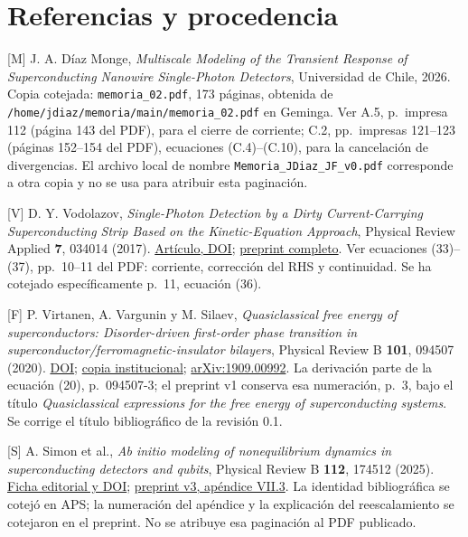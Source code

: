 \documentclass[
  spanish,
  10pt,
  a4paper,
]{article}
\newcounter{none} %
\begin{document}
\section{Referencias y procedencia}\label{referencias-y-procedencia}

{[}M{]} J. A. Díaz Monge, \emph{Multiscale Modeling of the Transient
Response of Superconducting Nanowire Single-Photon Detectors},
Universidad de Chile, 2026. Copia cotejada: \nolinkurl{memoria_02.pdf},
173 páginas, obtenida de
\nolinkurl{/home/jdiaz/memoria/main/memoria_02.pdf} en Geminga. Ver A.5,
p.~impresa 112 (página 143 del PDF), para el cierre de corriente; C.2,
pp.~impresas 121--123 (páginas 152--154 del PDF), ecuaciones
(C.4)--(C.10), para la cancelación de divergencias. El archivo local de
nombre \nolinkurl{Memoria_JDiaz_JF_v0.pdf} corresponde a otra copia y no
se usa para atribuir esta paginación.

{[}V{]} D. Y. Vodolazov, \emph{Single-Photon Detection by a Dirty
Current-Carrying Superconducting Strip Based on the Kinetic-Equation
Approach}, Physical Review Applied \textbf{7}, 034014 (2017).
\href{https://doi.org/10.1103/PhysRevApplied.7.034014}{Artículo, DOI};
\href{https://arxiv.org/pdf/1611.06060}{preprint completo}. Ver
ecuaciones (33)--(37), pp.~10--11 del PDF: corriente, corrección del RHS
y continuidad. Se ha cotejado específicamente p.~11, ecuación (36).

{[}F{]} P. Virtanen, A. Vargunin y M. Silaev, \emph{Quasiclassical free
energy of superconductors: Disorder-driven first-order phase transition
in superconductor/ferromagnetic-insulator bilayers}, Physical Review B
\textbf{101}, 094507 (2020).
\href{https://doi.org/10.1103/PhysRevB.101.094507}{DOI};
\href{https://jyx.jyu.fi/bitstreams/f577693c-c6d1-4923-866c-353ec3ac8dd5/download}{copia
institucional};
\href{https://arxiv.org/pdf/1909.00992}{arXiv:1909.00992}. La derivación
parte de la ecuación (20), p.~094507-3; el preprint v1 conserva esa
numeración, p.~3, bajo el título \emph{Quasiclassical expressions for
the free energy of superconducting systems}. Se corrige el título
bibliográfico de la revisión 0.1.

{[}S{]} A. Simon et al., \emph{Ab initio modeling of nonequilibrium
dynamics in superconducting detectors and qubits}, Physical Review B
\textbf{112}, 174512 (2025).
\href{https://journals.aps.org/prb/abstract/10.1103/3m2k-mzr6}{Ficha
editorial y DOI};
\href{https://arxiv.org/html/2501.13791v3\#S7.SS3}{preprint v3, apéndice
VII.3}. La identidad bibliográfica se cotejó en APS; la numeración del
apéndice y la explicación del reescalamiento se cotejaron en el
preprint. No se atribuye esa paginación al PDF publicado.
\end{document}
